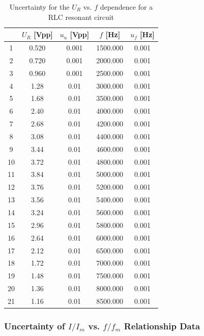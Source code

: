 \documentclass[a4paper]{article}
\begin{document}
\begin{table}[!htbp]
	\centering
	\begin{tabular}{c|cc|cc}
		\hline
		   & $U_R$ [Vpp] & $u_u$ [Vpp] & $f$ [Hz] & $u_f$ [Hz] \\
		\hline
		1  & 0.520       & 0.001       & 1500.000 & 0.001      \\
		2  & 0.720       & 0.001       & 2000.000 & 0.001      \\
		3  & 0.960       & 0.001       & 2500.000 & 0.001      \\
		4  & 1.28        & 0.01        & 3000.000 & 0.001      \\
		5  & 1.68        & 0.01        & 3500.000 & 0.001      \\
		6  & 2.40        & 0.01        & 4000.000 & 0.001      \\
		7  & 2.68        & 0.01        & 4200.000 & 0.001      \\
		8  & 3.08        & 0.01        & 4400.000 & 0.001      \\
		9  & 3.44        & 0.01        & 4600.000 & 0.001      \\
		10 & 3.72        & 0.01        & 4800.000 & 0.001      \\
		11 & 3.84        & 0.01        & 5000.000 & 0.001      \\
		12 & 3.76        & 0.01        & 5200.000 & 0.001      \\
		13 & 3.56        & 0.01        & 5400.000 & 0.001      \\
		14 & 3.24        & 0.01        & 5600.000 & 0.001      \\
		15 & 2.96        & 0.01        & 5800.000 & 0.001      \\
		16 & 2.64        & 0.01        & 6000.000 & 0.001      \\
		17 & 2.12        & 0.01        & 6500.000 & 0.001      \\
		18 & 1.72        & 0.01        & 7000.000 & 0.001      \\
		19 & 1.48        & 0.01        & 7500.000 & 0.001      \\
		20 & 1.36        & 0.01        & 8000.000 & 0.001      \\
		21 & 1.16        & 0.01        & 8500.000 & 0.001      \\
		\hline
	\end{tabular}
	\caption{Uncertainty for the $U_R$ vs. $f$ dependence for a RLC resonant circuit}
\end{table}

\subsubsection{Uncertainty of $I/I_m$ vs. $f/f_m$ Relationship Data}
\end{document}
